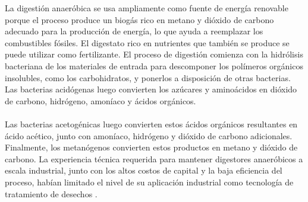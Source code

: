 \documentclass[a4paper,11pt]{article}
\begin{document}
La digestión anaeróbica se usa ampliamente como fuente de energía renovable porque el proceso produce un biogás rico en metano y dióxido de carbono adecuado para la producción de energía, lo que ayuda a reemplazar los combustibles fósiles. El digestato rico en nutrientes que también se produce se puede utilizar como fertilizante. El proceso de digestión comienza con la hidrólisis bacteriana de los materiales de entrada para descomponer los polímeros orgánicos insolubles, como los carbohidratos, y ponerlos a disposición de otras bacterias. Las bacterias acidógenas luego convierten los azúcares y aminoácidos en dióxido de carbono, hidrógeno, amoníaco y ácidos orgánicos. 
\\\\
Las bacterias acetogénicas luego convierten estos ácidos orgánicos resultantes en ácido acético, junto con amoníaco, hidrógeno y dióxido de carbono adicionales. Finalmente, los metanógenos convierten estos productos en metano y dióxido de carbono. La experiencia técnica requerida para mantener digestores anaeróbicos a escala industrial, junto con los altos costos de capital y la baja eficiencia del proceso, habían limitado el nivel de su aplicación industrial como tecnología de tratamiento de desechos \cite{Ionel2010}.




\end{document}
